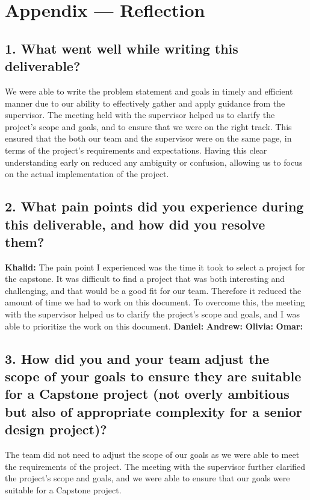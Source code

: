 \documentclass{article}
\begin{document}
\section*{Appendix --- Reflection}

\iffalse
\wss{Not required for CAS 741}
\fi



\subsection*{1. What went well while writing this deliverable?}
We were able to write the problem statement and goals in timely and efficient manner due to our ability to effectively gather and apply guidance from the supervisor. The meeting held with the supervisor helped us to clarify the project's scope and goals, and to ensure that we were on the right track. This ensured that the both our team and the supervisor were on the same page, in terms of the project's requirements and expectations. Having this clear understanding early on reduced any ambiguity or confusion, allowing us to focus on the actual implementation of the project.

\subsection*{2. What pain points did you experience during this deliverable, and how did you resolve them?}
\bigskip
\textbf{Khalid:} The pain point I experienced was the time it took to select a project for the capstone. It was difficult to find a project that was both interesting and challenging, and that would be a good fit for our team. Therefore it reduced the amount of time we had to work on this document. To overcome this, the meeting with the supervisor helped us to clarify the project's scope and goals, and I was able to prioritize the work on this document.
\newline
\newline
\textbf{Daniel:}
\newline
\newline
\textbf{Andrew:}
\newline
\newline
\textbf{Olivia:}
\newline
\newline
\textbf{Omar:}


\subsection*{3. How did you and your team adjust the scope of your goals to ensure they are suitable for a Capstone project (not overly ambitious but also of appropriate complexity for a senior design project)?}
The team did not need to adjust the scope of our goals as we were able to meet the requirements of the project. The meeting with the supervisor further clarified the project's scope and goals, and we were able to ensure that our goals were suitable for a Capstone project.
\end{document}
